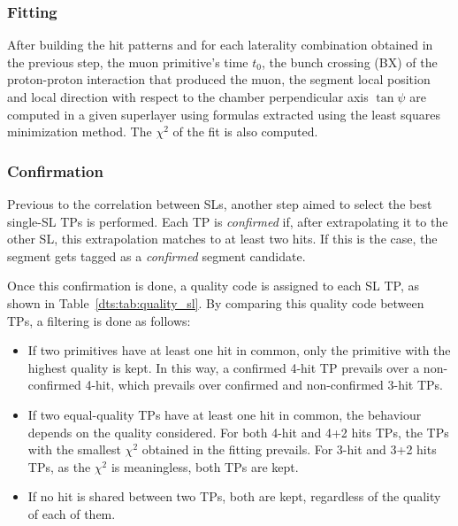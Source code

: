 \documentclass[../main.tex]{subfiles}
\begin{document}
\subsubsection*{Fitting}

After building the hit patterns and for each laterality combination obtained in the previous step, the muon primitive's time $t_0$, the bunch crossing (BX) of the proton-proton interaction that produced the muon, the segment local position and local direction with respect to the chamber perpendicular axis $\tan\psi$ are computed in a given superlayer using formulas extracted using the least squares minimization method. The $\chi^2$ of the fit is also computed.


\subsubsection*{Confirmation}

Previous to the correlation between SLs, another step aimed to select the best single-SL TPs is performed. Each TP is \textit{confirmed} if, after extrapolating it to the other SL, this extrapolation matches to at least two hits. If this is the case, the segment gets tagged as a \textit{confirmed} segment candidate.

Once this confirmation is done, a quality code is assigned to each SL TP, as shown in Table~\ref{dts:tab:quality_sl}. By comparing this quality code between TPs, a filtering is done as follows:

\begin{itemize}
\item If two primitives have at least one hit in common, only the primitive with the highest quality is kept. In this way, a confirmed 4-hit TP prevails over a non-confirmed 4-hit, which prevails over confirmed and non-confirmed 3-hit TPs.
\item If two equal-quality TPs have at least one hit in common, the behaviour depends on the quality considered. For both 4-hit and 4+2 hits TPs, the TPs with the smallest $\chi^2$ obtained in the fitting prevails. For 3-hit and 3+2 hits TPs, as the $\chi^2$ is meaningless, both TPs are kept.
\item If no hit is shared between two TPs, both are kept, regardless of the quality of each of them.
\end{itemize}
\end{document}

